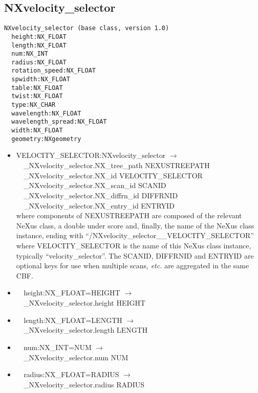 \documentclass[11pt]{article}
\begin{document}
{{\subsection{NXvelocity\_selector}

\begin{verbatim}
NXvelocity_selector (base class, version 1.0)
  height:NX_FLOAT
  length:NX_FLOAT
  num:NX_INT
  radius:NX_FLOAT
  rotation_speed:NX_FLOAT
  spwidth:NX_FLOAT
  table:NX_FLOAT
  twist:NX_FLOAT
  type:NX_CHAR
  wavelength:NX_FLOAT
  wavelength_spread:NX_FLOAT
  width:NX_FLOAT
  geometry:NXgeometry
\end{verbatim}

\begin{itemize}

\item{VELOCITY\_SELECTOR:NXvelocity\_selector $\rightarrow$\\
\verb|  |\_NXvelocity\_selector.NX\_tree\_path    NEXUSTREEPATH \\
\verb|  |\_NXvelocity\_selector.NX\_id            VELOCITY\_SELECTOR \\
\verb|  |\_NXvelocity\_selector.NX\_scan\_id      SCANID \\
\verb|  |\_NXvelocity\_selector.NX\_diffrn\_id    DIFFRNID \\
\verb|  |\_NXvelocity\_selector.NX\_entry\_id     ENTRYID \\
where components of NEXUSTREEPATH are composed of the
relevant NeXus class, a double under score and, finally, the
name of the NeXus class instance, ending with ``/NXvelocity\_selector\_\_VELOCITY\_SELECTOR''
where VELOCITY\_SELECTOR is the name of this NeXus class instance, typically ``velocity\_selector''.
The SCANID, DIFFRNID and ENTRYID are optional keys for use
when multiple scans, {\it etc.} are aggregated in the same CBF.}

\item{\verb|  |height:NX\_FLOAT=HEIGHT $\rightarrow$\\
\verb|  |\_NXvelocity\_selector.height HEIGHT}

\item{\verb|  |length:NX\_FLOAT=LENGTH $\rightarrow$\\
\verb|  |\_NXvelocity\_selector.length LENGTH}

\item{\verb|  |num:NX\_INT=NUM $\rightarrow$\\
\verb|  |\_NXvelocity\_selector.num NUM}

\item{\verb|  |radius:NX\_FLOAT=RADIUS $\rightarrow$\\
\verb|  |\_NXvelocity\_selector.radius RADIUS}


\end{itemize}}}
\end{document}
